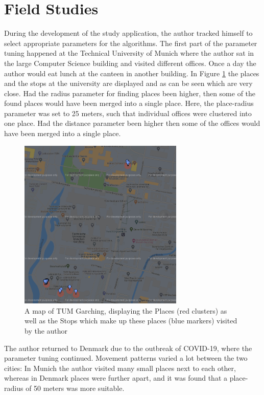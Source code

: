\section{Field Studies}
During the development of the study application, the author tracked himself to select appropriate parameters for the algorithms. The first part of the parameter tuning happened at the Technical University of Munich where the author sat in the large Computer Science building and visited different offices. Once a day the author would eat lunch at the canteen in another building. In Figure \ref{fig:tum-map} the places and the stops at the university are displayed and as can be seen which are very close. Had the radius parameter for finding places been higher, then some of the found places would have been merged into a single place. Here, the place-radius parameter was set to 25 meters, such that individual offices were clustered into one place. Had the distance parameter been higher then some of the offices would have been merged into a single place.\\

\begin{figure}
    \centering
    \includegraphics[width=0.7\textwidth]{images/map/map-tum.png}
    \caption{A map of TUM Garching, displaying the Places (red clusters) as well as the Stops which make up these places (blue markers) visited by the author}
    \label{fig:tum-map}
\end{figure}

The author returned to Denmark due to the outbreak of COVID-19, where the parameter tuning continued. Movement patterns varied a lot between the two cities: In Munich the author visited many small places next to each other, whereas in Denmark places were further  apart, and it was found that a place-radius of 50 meters was more suitable.\\

